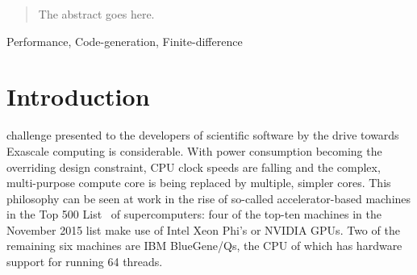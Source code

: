 \documentclass[journal]{IEEEtran}
\begin{document}

\maketitle

\begin{abstract}
The abstract goes here.
\end{abstract}

\begin{IEEEkeywords}
Performance, Code-generation, Finite-difference
\end{IEEEkeywords}



%
\IEEEpeerreviewmaketitle


\section{Introduction}
% 
% 
% 
% 
 challenge presented to the developers of
scientific software by the drive towards Exascale computing is
considerable. With power consumption becoming the overriding design
constraint, CPU clock speeds are falling and the complex,
multi-purpose compute core is being replaced by multiple, simpler
cores. This philosophy can be seen at work in the rise of so-called
accelerator-based machines in the Top 500 List~\cite{top500} of
supercomputers: four of the top-ten machines in the November 2015 list
make use of Intel Xeon Phi's or NVIDIA GPUs. Two of the remaining six
machines are IBM BlueGene/Qs, the CPU of which has hardware support
for running 64 threads.
\end{document}

